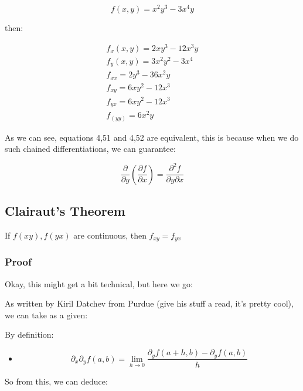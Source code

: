\documentclass[11pt,fleqn]{book} %
\begin{document}
\begin{equation}
    f(x,y) = x^2 y^3 - 3x^4 y
 \end{equation}

then:

\begin{gather}
    f_x(x,y) = 2xy^3 - 12x^3 y \\
    f_y(x,y) = 3x^2 y^2 - 3x^4 \\
    f_{xx} = 2y^3 - 36x^2y \\
    f_{xy} = 6xy^2 - 12x^3 \\
    f_{yx} = 6xy^2 - 12x^3 \\
    f_(yy) = 6x^2y
\end{gather}

As we can see, equations 4,51 and 4,52 are equivalent, this is because when we do
such chained differentiations, we can guarantee:

\begin{equation}
    \frac{\partial}{\partial y} (\frac{\partial f }{\partial x}) = \frac{\partial^2 f}{\partial y \partial x}
\end{equation}

\subsection{Clairaut's Theorem}

If $ f(xy), f(yx) $ are continuous, then $f_{xy} = f_{yx}$ 

\subsubsection*{Proof}

Okay, this might get a bit technical, but here we go:

As written by Kiril Datchev from Purdue\cite[]{} (give his stuff a read, it's pretty cool), we can take as a given:

By definition:
\begin{itemize}
    \item \begin{equation}
        \partial_x \partial_y f(a,b) = \lim_{h \to 0} \frac{\partial_y f(a + h, b) - \partial_y f(a,b)}{h}
    \end{equation}
\end{itemize}

So from this, we can deduce:
\begin{gather}
    \\
\end{gather}
\end{document}
